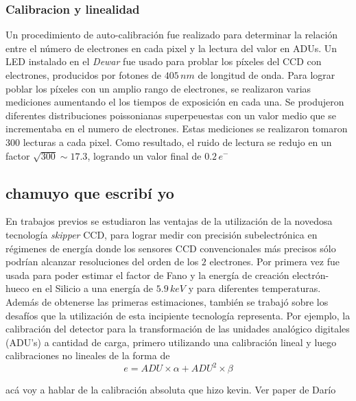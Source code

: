 \subsubsection{Calibracion y linealidad}
Un procedimiento de auto-calibración fue realizado para determinar la relación entre el número de electrones en cada pixel y la lectura del valor en ADUs. Un LED instalado en el \textit{Dewar} fue usado para problar los píxeles del CCD con electrones, producidos por fotones de $405\,\si{nm}$ de longitud de onda. Para lograr poblar los píxeles con un amplio rango de electrones, se realizaron varias mediciones aumentando el los tiempos de exposición en cada una. Se produjeron diferentes distribuciones poissonianas superpeuestas con un valor medio que se incrementaba en el numero de electrones. Estas mediciones se realizaron tomaron 300 lecturas a cada pixel. Como resultado, el ruido de lectura se redujo en un factor $\sqrt{300} \sim 17.3$, logrando un valor final de $0.2\,e^{-}$

\subsection{chamuyo que escribí yo}
\noindent En trabajos previos se estudiaron las ventajas de la utilización de la novedosa tecnología \textit{skipper} CCD, para lograr medir con precisión subelectrónica en régimenes de energía donde los sensores CCD convencionales más precisos sólo podrían alcanzar resoluciones del orden de los $2$ electrones. Por primera vez fue usada para poder estimar el factor de Fano y la energía de creación electrón-hueco en el Silicio a una energía de $5.9\,\si{keV}$ y para diferentes temperaturas. Además de obtenerse las primeras estimaciones, también se trabajó sobre los desafíos que la utilización de esta incipiente tecnología representa. Por ejemplo, la calibración del detector para la transformación de las unidades analógico digitales (ADU's) a cantidad de carga, primero utilizando una calibración lineal y luego calibraciones no lineales de la forma de
\begin{equation*}
    e = ADU \times \alpha + ADU^{2} \times \beta
\end{equation*}

acá voy a hablar de la calibración absoluta que hizo kevin. Ver paper de Darío
